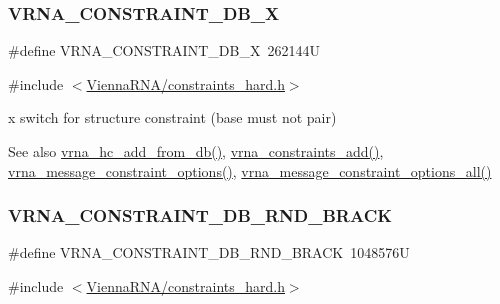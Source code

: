 \subsubsection{\texorpdfstring{V\+R\+N\+A\+\_\+\+C\+O\+N\+S\+T\+R\+A\+I\+N\+T\+\_\+\+D\+B\+\_\+X}{VRNA\_CONSTRAINT\_DB\_X}}
{\footnotesize\ttfamily \#define V\+R\+N\+A\+\_\+\+C\+O\+N\+S\+T\+R\+A\+I\+N\+T\+\_\+\+D\+B\+\_\+X~262144U}



{\ttfamily \#include $<$\hyperlink{constraints__hard_8h}{Vienna\+R\+N\+A/constraints\+\_\+hard.\+h}$>$}



\textquotesingle{}x\textquotesingle{} switch for structure constraint (base must not pair) 

\begin{DoxySeeAlso}{See also}
\hyperlink{group__hard__constraints_ga5b4de3247b67358080c176b94591a8e6}{vrna\+\_\+hc\+\_\+add\+\_\+from\+\_\+db()}, \hyperlink{group__constraints_ga35a401f680969a556858a8dd5f1d07cc}{vrna\+\_\+constraints\+\_\+add()}, \hyperlink{group__constraints_gaa1f20b53bf09ac2e6b0dbb13f7d89670}{vrna\+\_\+message\+\_\+constraint\+\_\+options()}, \hyperlink{group__constraints_gaec7e13fa0465c2acc7a621d1aecb709f}{vrna\+\_\+message\+\_\+constraint\+\_\+options\+\_\+all()} 
\end{DoxySeeAlso}
\mbox{\label{group__hard__constraints_gac17b034852c914bc5879954c65d7e74b}} 
\subsubsection{\texorpdfstring{V\+R\+N\+A\+\_\+\+C\+O\+N\+S\+T\+R\+A\+I\+N\+T\+\_\+\+D\+B\+\_\+\+R\+N\+D\+\_\+\+B\+R\+A\+CK}{VRNA\_CONSTRAINT\_DB\_RND\_BRACK}}
{\footnotesize\ttfamily \#define V\+R\+N\+A\+\_\+\+C\+O\+N\+S\+T\+R\+A\+I\+N\+T\+\_\+\+D\+B\+\_\+\+R\+N\+D\+\_\+\+B\+R\+A\+CK~1048576U}



{\ttfamily \#include $<$\hyperlink{constraints__hard_8h}{Vienna\+R\+N\+A/constraints\+\_\+hard.\+h}$>$}



